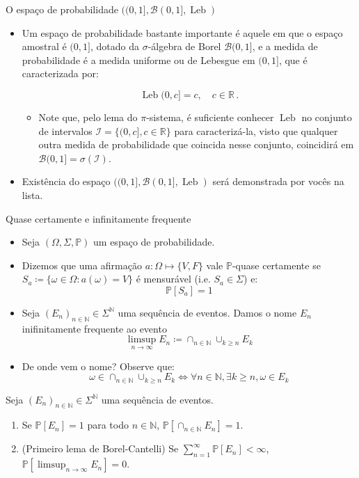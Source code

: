 \documentclass[11pt]{beamer}
\begin{document}
\begin{frame}{O espaço de probabilidade $((0,1],\mathcal{B}(0,1], \operatorname{Leb})$}
\begin{itemize}
	\item Um espaço de probabilidade bastante importante é aquele em que o espaço amostral é $(0,1]$, dotado da $\sigma$-álgebra de Borel $\mathcal{B}(0,1]$, e a medida de probabilidade é a {\color{red}medida uniforme ou de Lebesgue} em $(0,1]$, que é {\color{blue}caracterizada} por:
	
	$$\operatorname{Leb}(0,c] = c,\quad c \in \mathbb{R}\, .$$
	\begin{itemize}
		\item Note que, pelo lema do $\pi$-sistema, é suficiente conhecer $\operatorname{Leb}$ no conjunto de intervalos $\mathcal{I} = \{(0,c], c \in \mathbb{R}\}$ para caracterizá-la, visto que qualquer outra medida de probabilidade que coincida nesse conjunto, coincidirá em $\mathcal{B}(0,1] = \sigma(\mathcal{I})$.
	\end{itemize}
	\item {\color{orange}Existência} do espaço $((0,1],\mathcal{B}(0,1], \operatorname{Leb})$ será demonstrada por vocês na lista.
\end{itemize}
\end{frame}

\begin{frame}{Quase certamente e infinitamente frequente}
\begin{itemize}
	\item Seja $(\Omega, \Sigma,\mathbb{P})$ um espaço de probabilidade.
	\item Dizemos que uma afirmação $a: \Omega \mapsto \{V,F\}$ vale $\mathbb{P}$-quase certamente se $S_a \coloneqq \{\omega \in \Omega: a(\omega)=V\}$ é mensurável (i.e. $S_a \in \Sigma$) e:
	$$\mathbb{P}[S_a] = 1$$
	\item Seja $(E_n)_{n \in \mathbb{N}} \in \Sigma^{\mathbb{N}}$ uma sequência de eventos. Damos o nome {\color{red}$E_n$ inifinitamente frequente} ao evento
	$$\limsup_{n \to \infty} E_n \coloneqq \cap_{n \in \mathbb{N}}  \cup_{k\geq n}E_k$$
	\item De onde vem o nome? Observe que:
	$$ \omega \in \cap_{n \in \mathbb{N}}  \cup_{k\geq n}E_k \iff \forall n \in \mathbb{N}, \exists k \geq n, \omega \in E_k$$
\end{itemize}
\vspace{-1em}
	\begin{lemma}
	Seja $(E_n)_{n \in \mathbb{N}} \in \Sigma^{\mathbb{N}} $ uma sequência de eventos.
	\begin{enumerate}
		\item Se $\mathbb{P}[E_n]=1 $ para todo $n \in \mathbb{N}$, $\mathbb{P}[\cap_{n \in \mathbb{N}}E_n]=1$.
		\item (Primeiro lema de Borel-Cantelli) Se $\sum_{n=1}^\infty \mathbb{P}[E_n] < \infty$, $\mathbb{P}[\limsup_{n \to \infty} E_n] = 0$.
	\end{enumerate}
\end{lemma}
\end{frame}
\end{document}
